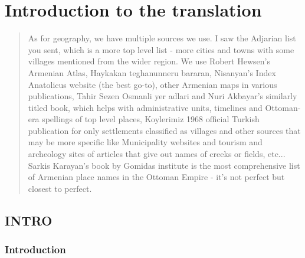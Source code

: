 \part{Introduction to the translation}
















\begin{quote}
	As for geography, we have multiple sources we use. I saw the Adjarian list you sent, which is a more top level list - more cities and towns with some villages mentioned from the wider region. We use Robert Hewsen's Armenian Atlas, Haykakan teghanunneru bararan, Nisanyan's Index Anatolicus website (the best go-to), other Armenian maps in various publications, Tahir Sezen Osmanli yer adlari and Nuri Akbayar's similarly titled book, which helps with administrative units, timelines and Ottoman-era spellings of top level places, Koylerimiz 1968 official Turkish publication for only settlements classified as villages and other sources that may be more specific like Municipality websites and tourism and archeology sites of articles that give out names of creeks or fields, etc... Sarkis Karayan's book by Gomidas institute is the most comprehensive list of Armenian place names in the Ottoman Empire - it's not perfect but closest to perfect.
\end{quote}

\chapter{INTRO}


\section{Introduction}

